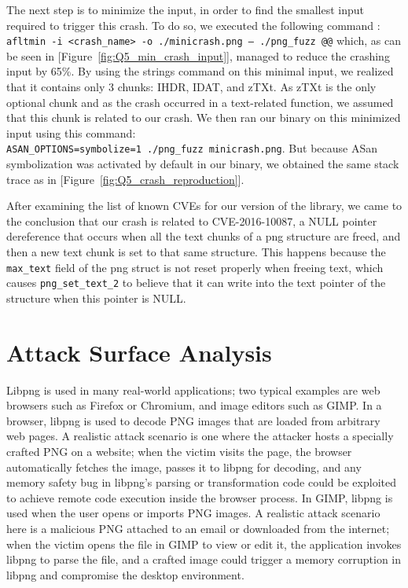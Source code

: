 The next step is to minimize the input, in order to find the smallest input required to trigger this crash. To do so, we executed the following command : \texttt{afl\-tmin\ -i\ <crash\_name>\ -o\ ./mini\-crash.png\ --\ ./png\_fuzz\ @@} which, as can be seen in [Figure~\ref{fig:Q5_min_crash_input}], managed to reduce the crashing input by 65\%. By using the strings command on this minimal input, we realized that it contains only 3 chunks: IHDR, IDAT, and zTXt. As zTXt is the only optional chunk and as the crash occurred in a text-related function, we assumed that this chunk is related to our crash. We then ran our binary on this minimized input using this command: \texttt{ASAN\_OPTIONS=symbolize=1\ ./png\_fuzz\ mini\-crash.png}. But because ASan symbolization was activated by default in our binary, we obtained the same stack trace as in [Figure~\ref{fig:Q5_crash_reproduction}].

After examining the list of known CVEs for our version of the library, we came to the conclusion that our crash is related to CVE-2016-10087\cite{cve2016_10087}, a NULL pointer dereference that occurs when all the text chunks of a png structure are freed, and then a new text chunk is set to that same structure. This happens because the \texttt{max\_text} field of the png struct is not reset properly when freeing text, which causes \texttt{png\_set\_text\_2} to believe that it can write into the text pointer of the structure when this pointer is NULL.

\section{Attack Surface Analysis}

Libpng is used in many real-world applications; two typical examples are web browsers such as Firefox or Chromium, and image editors such as GIMP. In a browser, libpng is used to decode PNG images that are loaded from arbitrary web pages. A realistic attack scenario is one where the attacker hosts a specially crafted PNG on a website; when the victim visits the page, the browser automatically fetches the image, passes it to libpng for decoding, and any memory safety bug in libpng’s parsing or transformation code could be exploited to achieve remote code execution inside the browser process. In GIMP, libpng is used when the user opens or imports PNG images. A realistic attack scenario here is a malicious PNG attached to an email or downloaded from the internet; when the victim opens the file in GIMP to view or edit it, the application invokes libpng to parse the file, and a crafted image could trigger a memory corruption in libpng and compromise the desktop environment.

